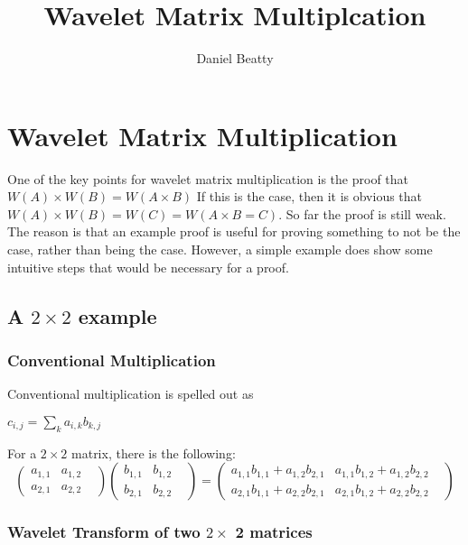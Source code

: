\documentclass[11pt]{article}
\title{Wavelet Matrix Multiplcation}
\author{Daniel Beatty}
\begin{document}
\maketitle

\section {Wavelet Matrix Multiplication}

One of the key points for wavelet matrix multiplication is the proof that $W(A) \times W(B) = W(A\times B)$  If this is the case, then it is obvious that $W(A) \times W(B) = W(C) = W(A\times B = C)$.  So far the proof is still weak.  The reason is that an example proof is useful for proving something to not be the case, rather than being the case.   However, a simple example does show some intuitive steps that would be necessary for a proof.  

\subsection{A $2\times 2$ example}
\subsubsection{Conventional Multiplication}

Conventional multiplication is spelled out as

$c_{i,j} = \sum\limits_k a_{i,k} b_{k,j}$

For a $2 \times 2$ matrix, there is the following:
\[
\left(
\begin{array}{ccc}
  a_{1,1}&  a_{1,2} &   \\
 a_{2,1} &  a_{2,2} &   
\end{array}
\right)
\left(
\begin{array}{ccc}
  b_{1,1}&  b_{1,2} &   \\
 b_{2,1} &  b_{2,2} &   
\end{array}
\right) =
\left(
\begin{array}{ccc}
  a_{1,1} b_{1,1} + a_{1,2} b_{2,1}&  a_{1,1}b_{1,2} + a_{1,2}  b_{2,2} &   \\
 a_{2,1} b_{1,1} + a_{2,2} b_{2,1} &  a_{2,1} b_{1,2} + a_{2,2} b_{2,2} &   
\end{array}
\right)
\]

\subsubsection{Wavelet Transform of two $2\times$ 2 matrices}
\end{document}
